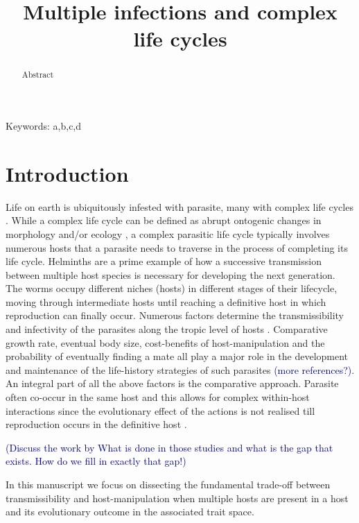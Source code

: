 \documentclass{article}
\title{\vspace*{-22mm}\bf Multiple infections and complex life cycles}
\date{}
\newcommand{\cha}[1]{\textcolor{darkblue}{(#1)}}
\begin{document}
\linenumbers
\maketitle


\begin{abstract}
Abstract
\end{abstract}


\noindent
Keywords: a,b,c,d


\tableofcontents

\section{Introduction}

Life on earth is ubiquitously infested with parasite, many with complex life cycles \citep{zimmer:book:2001}.
While a complex life cycle can be defined as abrupt ontogenic changes in morphology and/or ecology \citep{Benesh:2016dj}, a complex parasitic life cycle typically involves numerous hosts that a parasite needs to traverse in the process of completing its life cycle.
Helminths are a prime example of how a successive transmission between multiple host species is necessary for developing the next generation.
The worms occupy different niches (hosts) in different stages of their lifecycle, moving through intermediate hosts until reaching a definitive host in which reproduction can finally occur.
Numerous factors determine the transmissibility and infectivity of the parasites along the tropic level of hosts \citep{froelick:PRSB:2021}.
Comparative growth rate, eventual body size, cost-benefits of host-manipulation and the probability of eventually finding a mate all play a major role in the development and maintenance of the life-history strategies of such parasites \citep{parker:Nature:2003,hammerschmidt:Evolution:2009} \cha{more references?}.
An integral part of all the above factors is the comparative approach.
Parasite often co-occur in the same host and this allows for complex within-host interactions since the evolutionary effect of the actions is not realised till reproduction occurs in the definitive host \citep{Hafer:2015gl}.

\cha{Discuss the work by \citep{alizon:AmNat:2008,gandon:Evolution:2009} 
What is done in those studies and what is the gap that exists. How do we fill in exactly that gap!}


In this manuscript we focus on dissecting the fundamental trade-off between transmissibility and host-manipulation when multiple hosts are present in a host and its evolutionary outcome in the associated trait space.
\end{document}
